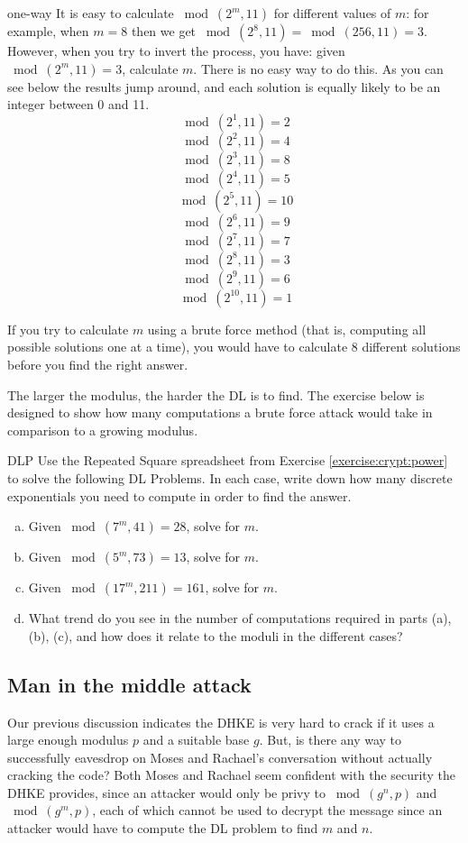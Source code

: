 \begin{example}{one-way}
It is easy to calculate $\bmod(2^{m},  11)$ for different values of $m$: for example, when $m =8$ then we get $\bmod(2^{8},  11) =\bmod(256,  11)  = 3$.  However, when you try to invert the process, you have: given $\bmod(2^{m},  11) = 3$, calculate $m$. There is no easy way to do this. As you can see below the results jump around, and each solution is equally likely to be an integer between 0 and 11. 
$$ \bmod(2^{1}, 11)=2$$
$$ \bmod(2^{2}, 11)=4$$
$$ \bmod(2^{3}, 11)=8$$
$$ \bmod(2^{4}, 11)=5$$
$$ \bmod(2^{5}, 11)=10$$
$$ \bmod(2^{6}, 11)=9$$
$$ \bmod(2^{7}, 11)=7$$
$$ \bmod(2^{8}, 11)=3$$
$$ \bmod(2^{9}, 11)=6$$
$$ \bmod(2^{10}, 11)=1$$
\end{example}
If you try to calculate $m$ using a brute force method (that is, computing all possible solutions one at a time), you would have to calculate 8 different solutions before you find the right answer. 

The larger the modulus, the harder the DL is to find. The exercise below is designed to show how many computations a brute force attack would take in comparison to a growing modulus.

\begin{exercise}{DLP}
Use the Repeated Square spreadsheet from Exercise \ref{exercise:crypt:power} to solve the following DL Problems. In each case, write down how many discrete exponentials you need to compute in order to find the answer.  
\begin{enumerate}[(a)]
\item Given $ \bmod(7^{m}, 41)=28$, solve for $m$.

\item Given $ \bmod(5^{m}, 73)=13$, solve for $m$.

\item Given $ \bmod(17^{m}, 211)=161$, solve for $m$.

\item
What trend do you see in the number of computations required in parts (a), (b), (c), and how does it relate to the moduli in the different cases?
\end{enumerate}
\end{exercise}

\subsection{Man in the middle attack}
Our previous discussion indicates the DHKE is very hard to crack if it uses a large enough modulus $p$ and a suitable base $g$. But, is there any way to successfully eavesdrop on Moses and Rachael's conversation without actually cracking the code?  Both Moses and Rachael seem confident with the security the DHKE provides, since an attacker would only be privy to $\bmod (g^n , p)$ and $\bmod (g^m , p)$, each of which cannot be used to decrypt the message since an attacker would have to compute the DL problem to find $m$ and $n$. 


